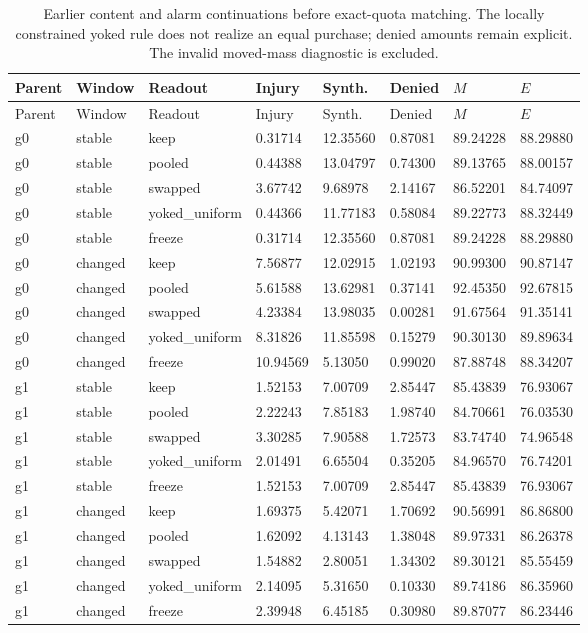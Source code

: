 \begin{longtable}{llllllll}
\caption{Earlier content and alarm continuations before exact-quota matching. The locally constrained yoked rule does not realize an equal purchase; denied amounts remain explicit. The invalid moved-mass diagnostic is excluded.}\label{tab:maintenance-earlier-content}\\
\toprule
Parent & Window & Readout & Injury & Synth. & Denied & $M$ & $E$ \\
\midrule
\endfirsthead
\toprule
Parent & Window & Readout & Injury & Synth. & Denied & $M$ & $E$ \\
\midrule
\endhead
g0 & stable & keep & 0.31714 & 12.35560 & 0.87081 & 89.24228 & 88.29880 \\
g0 & stable & pooled & 0.44388 & 13.04797 & 0.74300 & 89.13765 & 88.00157 \\
g0 & stable & swapped & 3.67742 & 9.68978 & 2.14167 & 86.52201 & 84.74097 \\
g0 & stable & yoked\_uniform & 0.44366 & 11.77183 & 0.58084 & 89.22773 & 88.32449 \\
g0 & stable & freeze & 0.31714 & 12.35560 & 0.87081 & 89.24228 & 88.29880 \\
g0 & changed & keep & 7.56877 & 12.02915 & 1.02193 & 90.99300 & 90.87147 \\
g0 & changed & pooled & 5.61588 & 13.62981 & 0.37141 & 92.45350 & 92.67815 \\
g0 & changed & swapped & 4.23384 & 13.98035 & 0.00281 & 91.67564 & 91.35141 \\
g0 & changed & yoked\_uniform & 8.31826 & 11.85598 & 0.15279 & 90.30130 & 89.89634 \\
g0 & changed & freeze & 10.94569 & 5.13050 & 0.99020 & 87.88748 & 88.34207 \\
g1 & stable & keep & 1.52153 & 7.00709 & 2.85447 & 85.43839 & 76.93067 \\
g1 & stable & pooled & 2.22243 & 7.85183 & 1.98740 & 84.70661 & 76.03530 \\
g1 & stable & swapped & 3.30285 & 7.90588 & 1.72573 & 83.74740 & 74.96548 \\
g1 & stable & yoked\_uniform & 2.01491 & 6.65504 & 0.35205 & 84.96570 & 76.74201 \\
g1 & stable & freeze & 1.52153 & 7.00709 & 2.85447 & 85.43839 & 76.93067 \\
g1 & changed & keep & 1.69375 & 5.42071 & 1.70692 & 90.56991 & 86.86800 \\
g1 & changed & pooled & 1.62092 & 4.13143 & 1.38048 & 89.97331 & 86.26378 \\
g1 & changed & swapped & 1.54882 & 2.80051 & 1.34302 & 89.30121 & 85.55459 \\
g1 & changed & yoked\_uniform & 2.14095 & 5.31650 & 0.10330 & 89.74186 & 86.35960 \\
g1 & changed & freeze & 2.39948 & 6.45185 & 0.30980 & 89.87077 & 86.23446 \\
\bottomrule
\end{longtable}
\endgroup

